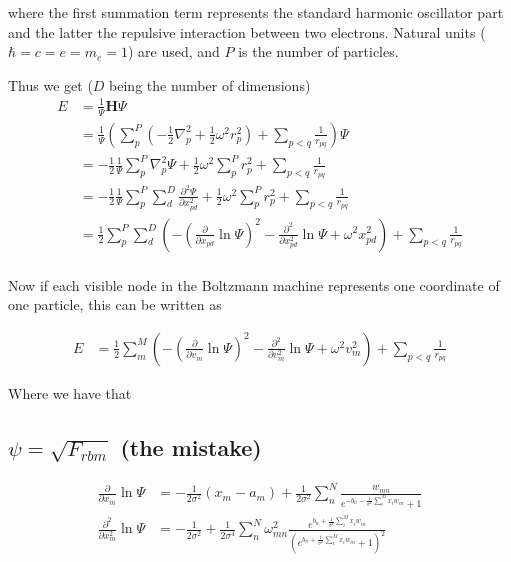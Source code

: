 \documentclass[norsk,a4paper,11pt]{article}
\begin{document}
where the first summation term represents the standard harmonic oscillator part and the latter the repulsive interaction between two electrons. Natural units ($\hbar=c=e=m_e=1$) are used, and $P$ is the number of particles.

Thus we get ($D$ being the number of dimensions)
\begin{align}
	E &= \frac{1}{\Psi} \mathbf{H} \Psi \\
	&= \frac{1}{\Psi} (\sum_p^P (-\frac{1}{2}\nabla_p^2 + \frac{1}{2}\omega^2 r_p^2 ) + \sum_{p<q} \frac{1}{r_{pq}}) \Psi \\
	&= -\frac{1}{2}\frac{1}{\Psi} \sum_p^P \nabla_p^2 \Psi 
	+ \frac{1}{2}\omega^2 \sum_p^P  r_p^2  + \sum_{p<q} \frac{1}{r_{pq}} \\
	&= -\frac{1}{2}\frac{1}{\Psi} \sum_p^P \sum_d^D \frac{\partial^2 \Psi}{\partial x_{pd}^2} + \frac{1}{2}\omega^2 \sum_p^P  r_p^2  + \sum_{p<q} \frac{1}{r_{pq}} \\
	&= \frac{1}{2} \sum_p^P \sum_d^D (-(\frac{\partial}{\partial x_{pd}} \ln\Psi)^2 -\frac{\partial^2}{\partial x_{pd}^2} \ln\Psi + \omega^2 x_{pd}^2)  + \sum_{p<q} \frac{1}{r_{pq}} \\
\end{align}

Now if each visible node in the Boltzmann machine represents one coordinate of one particle, this can be written as

\begin{align}
	E &=
	\frac{1}{2} \sum_m^M (-(\frac{\partial}{\partial v_m} \ln\Psi)^2 -\frac{\partial^2}{\partial v_m^2} \ln\Psi + \omega^2 v_m^2)  + \sum_{p<q} \frac{1}{r_{pq}}
\end{align}

Where we have that

\color{Green}
\subsection{$\psi = \sqrt{F_{rbm}}$ (the mistake)}
\color{Black}
\begin{align}
	\frac{\partial}{\partial x_m} \ln\Psi
	&= - \frac{1}{2\sigma^2}(x_m - a_m) + \frac{1}{2\sigma^2} \sum_n^N
 	\frac{w_{mn}}{e^{-b_n-\frac{1}{\sigma^2}\sum_i^M x_i w_{in}} + 1}
	\\
	\frac{\partial^2}{\partial x_m^2} \ln\Psi
	&= - \frac{1}{2\sigma^2} + \frac{1}{2\sigma^4}\sum_n^N \omega_{mn}^2 \frac{e^{b_n + \frac{1}{\sigma^2}\sum_i^M x_i w_{in}}}{(e^{b_n + \frac{1}{\sigma^2}\sum_i^M x_i w_{in}} + 1)^2}
\end{align}
\end{document}
